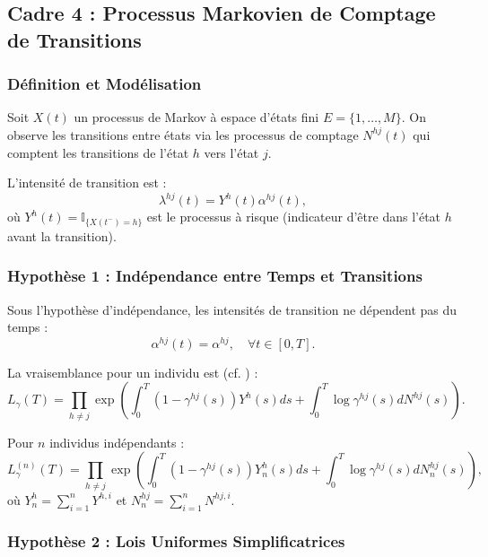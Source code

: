 \documentclass[11pt,a4paper]{article}
\begin{document}
	\subsection{Cadre 4 : Processus Markovien de Comptage de Transitions}
	\label{subsec:cadre_markov}
	
	\subsubsection{Définition et Modélisation}
	
	Soit $X(t)$ un processus de Markov à espace d'états fini $E = \{1, \dots, M\}$. On observe les transitions entre états via les processus de comptage $N^{hj}(t)$ qui comptent les transitions de l'état $h$ vers l'état $j$.
	
	L'intensité de transition est :
	\begin{equation}
		\lambda^{hj}(t) = Y^h(t) \alpha^{hj}(t),
	\end{equation}
	où $Y^h(t) = \mathbb{I}_{\{X(t^-) = h\}}$ est le processus à risque (indicateur d'être dans l'état $h$ avant la transition).
	
	\subsubsection{Hypothèse 1 : Indépendance entre Temps et Transitions}
	
	Sous l'hypothèse d'indépendance, les intensités de transition ne dépendent pas du temps :
	\begin{equation}
		\alpha^{hj}(t) = \alpha^{hj}, \quad \forall t \in [0,T].
	\end{equation}
	
	La vraisemblance pour un individu est (cf. \cite{Aalen75}) :
	\begin{equation}
		L_{\gamma}(T) = \prod_{h \neq j} \exp \left( \int_0^T (1 - \gamma^{hj}(s))Y^h(s)ds + \int_0^T \log \gamma^{hj}(s)dN^{hj}(s) \right).
	\end{equation}
	
	Pour $n$ individus indépendants :
	\begin{equation}
		L_{\gamma}^{(n)}(T) = \prod_{h \neq j} \exp \left( \int_0^T (1 - \gamma^{hj}(s))Y_n^h(s)ds + \int_0^T \log \gamma^{hj}(s)dN_n^{hj}(s) \right),
	\end{equation}
	où $Y_n^h = \sum_{i=1}^n Y^{h,i}$ et $N_n^{hj} = \sum_{i=1}^n N^{hj,i}$.
	
	\subsubsection{Hypothèse 2 : Lois Uniformes Simplificatrices}
	
\end{document}
